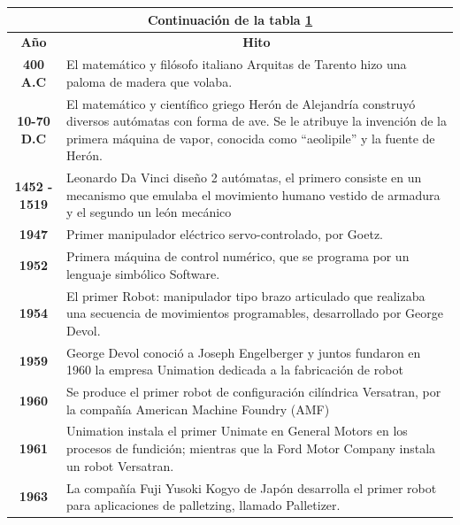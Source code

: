  \begin{longtable}[c]{c m{12cm}}
     \label{tab:cap2_efemerides}\\

     \endfirsthead
    
     \hline
     \multicolumn{2}{|c|}{Continuación de la tabla \ref{tab:cap2_efemerides}}\\
     \hline
     \endhead
    
     \hline
     \endfoot
    
     \hline
     \textbf{Año}  & \multicolumn{1}{c}{\textbf{Hito}}  \\\hline\hline
     \textbf{400 A.C} & El matemático y filósofo italiano Arquitas de Tarento hizo una paloma de madera que volaba. \\ \hline
     \textbf{10-70 D.C} & El matemático y científico griego Herón de Alejandría construyó diversos autómatas con forma de ave. Se le atribuye la invención de la primera máquina de vapor, conocida como “aeolipile” y la fuente de Herón. \\ \hline
     \textbf{1452 - 1519} & Leonardo Da Vinci diseño 2 autómatas, el primero consiste en un mecanismo que emulaba el movimiento humano vestido de armadura y el segundo un león mecánico \\ \hline
     \textbf{1947} & Primer manipulador eléctrico servo-controlado, por Goetz. \\ \hline
     \textbf{1952} & Primera máquina de control numérico, que se programa por un lenguaje simbólico Software. \\ \hline
     \textbf{1954} & El primer Robot: manipulador tipo brazo articulado que realizaba una secuencia de movimientos programables, desarrollado por George Devol. \\ \hline
     \textbf{1959} & George Devol conoció a Joseph Engelberger y juntos fundaron en 1960 la empresa Unimation dedicada a la fabricación de robot \\ \hline
     \textbf{1960} & Se produce el primer robot de configuración cilíndrica Versatran, por la compañía American Machine Foundry (AMF) \\ \hline
     \textbf{1961} & Unimation instala el primer Unimate en General Motors en los procesos de fundición; mientras que la Ford Motor Company instala un robot Versatran. \\ \hline
     \textbf{1963} & La compañía Fuji Yusoki Kogyo de Japón desarrolla el primer robot para aplicaciones de palletzing, llamado Palletizer. \\ \hline

\end{longtable}
